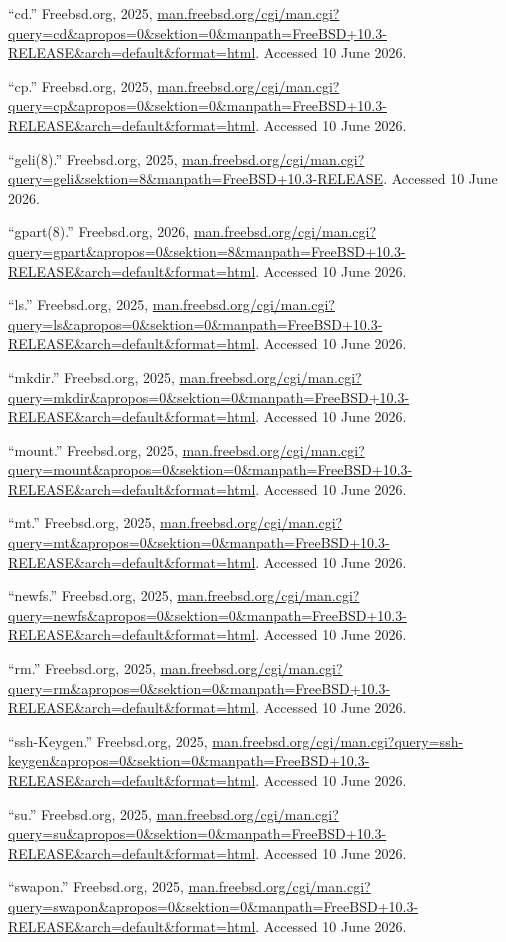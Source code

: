 “cd.” Freebsd.org, 2025, \url{man.freebsd.org/cgi/man.cgi?query=cd&apropos=0&sektion=0&manpath=FreeBSD+10.3-RELEASE&arch=default&format=html}. Accessed 10 June 2026.

“cp.” Freebsd.org, 2025, \url{man.freebsd.org/cgi/man.cgi?query=cp&apropos=0&sektion=0&manpath=FreeBSD+10.3-RELEASE&arch=default&format=html}. Accessed 10 June 2026.

“geli(8).” Freebsd.org, 2025, \url{man.freebsd.org/cgi/man.cgi?query=geli&sektion=8&manpath=FreeBSD+10.3-RELEASE}. Accessed 10 June 2026.

“gpart(8).” Freebsd.org, 2026, \url{man.freebsd.org/cgi/man.cgi?query=gpart&apropos=0&sektion=8&manpath=FreeBSD+10.3-RELEASE&arch=default&format=html}. Accessed 10 June 2026.

“ls.” Freebsd.org, 2025, \url{man.freebsd.org/cgi/man.cgi?query=ls&apropos=0&sektion=0&manpath=FreeBSD+10.3-RELEASE&arch=default&format=html}. Accessed 10 June 2026.

“mkdir.” Freebsd.org, 2025, \url{man.freebsd.org/cgi/man.cgi?query=mkdir&apropos=0&sektion=0&manpath=FreeBSD+10.3-RELEASE&arch=default&format=html}. Accessed 10 June 2026.

“mount.” Freebsd.org, 2025, \url{man.freebsd.org/cgi/man.cgi?query=mount&apropos=0&sektion=0&manpath=FreeBSD+10.3-RELEASE&arch=default&format=html}. Accessed 10 June 2026.

“mt.” Freebsd.org, 2025, \url{man.freebsd.org/cgi/man.cgi?query=mt&apropos=0&sektion=0&manpath=FreeBSD+10.3-RELEASE&arch=default&format=html}. Accessed 10 June 2026.

“newfs.” Freebsd.org, 2025, \url{man.freebsd.org/cgi/man.cgi?query=newfs&apropos=0&sektion=0&manpath=FreeBSD+10.3-RELEASE&arch=default&format=html}. Accessed 10 June 2026.

“rm.” Freebsd.org, 2025, \url{man.freebsd.org/cgi/man.cgi?query=rm&apropos=0&sektion=0&manpath=FreeBSD+10.3-RELEASE&arch=default&format=html}. Accessed 10 June 2026.

“ssh-Keygen.” Freebsd.org, 2025, \url{man.freebsd.org/cgi/man.cgi?query=ssh-keygen&apropos=0&sektion=0&manpath=FreeBSD+10.3-RELEASE&arch=default&format=html}. Accessed 10 June 2026.

“su.” Freebsd.org, 2025, \url{man.freebsd.org/cgi/man.cgi?query=su&apropos=0&sektion=0&manpath=FreeBSD+10.3-RELEASE&arch=default&format=html}. Accessed 10 June 2026.

“swapon.” Freebsd.org, 2025, \url{man.freebsd.org/cgi/man.cgi?query=swapon&apropos=0&sektion=0&manpath=FreeBSD+10.3-RELEASE&arch=default&format=html}. Accessed 10 June 2026.

